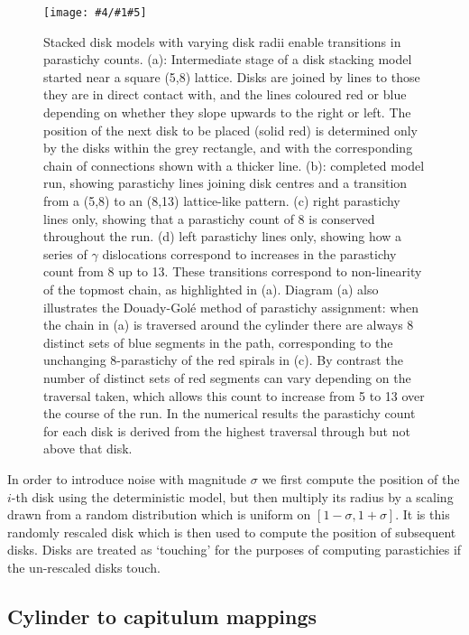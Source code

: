 \documentclass[a4paper,10pt]{amsart}
\newlength{\jfigwidth}
\newcommand{\pdffig}[3]{\jdofig{#1}{#2}{#3}{Figures}{.pdf}}
\newcommand{\jdofig}[5]{
	\begin{figure}\centering\texttt{[image: \#4/\#1\#5]} \caption{#2}\label{fig:#1}\end{figure}
}
\begin{document}
%
\pdffig{scpDeterministicTransition}{
	Stacked disk models with varying disk radii enable transitions in parastichy counts. (a): Intermediate stage of a disk stacking model started near a square  (5,8) lattice. Disks are joined by lines to those they are in direct contact with, and the lines coloured red or blue depending on whether they slope upwards to the right or left. The position of the next disk to be placed (solid red) is determined only by the disks within the grey rectangle, and with the corresponding chain of connections shown with a thicker line. (b): completed model run, showing parastichy lines joining disk centres and a transition  from a (5,8) to an (8,13) lattice-like pattern. (c) right parastichy lines only, showing that a parastichy count of 8 is conserved throughout the run.  (d)  left parastichy lines only, showing how a series of $\gamma$ dislocations correspond to increases in the parastichy count from 8 up to 13. These transitions correspond to non-linearity of the topmost chain, as highlighted in (a). Diagram (a) also illustrates the Douady-Gol\'e method of parastichy assignment:  when the chain in (a) is traversed around the cylinder there are always 8 distinct sets of blue segments in the path, corresponding to the unchanging 8-parastichy of the red spirals in (c). By contrast the number of distinct sets of red segments can vary depending on the traversal taken, which allows this count to increase from 5 to 13 over the course of the run. In the numerical results the parastichy count for each disk is derived from the highest traversal through but not above that disk.
}{1}%
 
  In order to introduce noise with magnitude $\sigma$ we first compute the position of the $i$-th disk using the deterministic model, but then multiply its radius by a scaling drawn from a random distribution which is uniform on $[1-\sigma,1+\sigma]$. It is this randomly rescaled disk which is then used to compute the position of subsequent disks. Disks are treated as `touching' for the purposes of computing parastichies if the un-rescaled disks touch. 
  
  
  
  \clearpage


\subsection{Cylinder to capitulum mappings}
\end{document}
